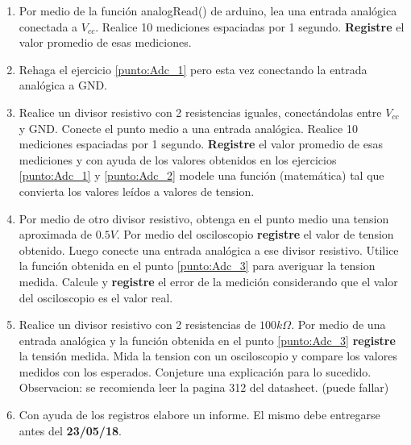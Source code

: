 \documentclass[10pt,conference,a4paper,onecolumn]{article}%
\begin{document}
\begin{enumerate}
\item  Por medio de la función analogRead() de arduino, lea una entrada analógica conectada a $V_{cc}$. Realice 10 mediciones espaciadas por 1 segundo. \textbf{Registre} el valor promedio de esas mediciones.\label{punto:Adc_1}
\item \label{punto:Adc_2} Rehaga el ejercicio \ref{punto:Adc_1} pero esta vez conectando la entrada analógica a GND.
\item \label{punto:Adc_3}  Realice un divisor resistivo con 2 resistencias iguales, conectándolas entre $V_{cc}$ y GND. Conecte el punto medio a una entrada analógica. Realice 10 mediciones espaciadas por 1 segundo. \textbf{Registre} el valor promedio de esas mediciones y  con ayuda de los valores obtenidos en los ejercicios \ref{punto:Adc_1} y \ref{punto:Adc_2} modele una función (matemática) tal que convierta los valores leídos a valores de tension. 
\item Por medio de otro divisor resistivo, obtenga en el punto medio una tension aproximada de $0.5V$. Por medio del osciloscopio \textbf{registre} el valor de tension obtenido. Luego conecte una entrada analógica a ese divisor resistivo. Utilice la función obtenida en el punto \ref{punto:Adc_3} para averiguar la tension medida. Calcule y \textbf{registre} el error de la medición considerando que el valor del osciloscopio es el valor real.   
\item Realice un divisor resistivo  con 2 resistencias de $100k\Omega$. Por medio de una entrada analógica y la función obtenida en el punto \ref{punto:Adc_3} \textbf{registre} la tensión medida. Mida la tension con un osciloscopio y compare los valores medidos con los esperados. Conjeture una explicación para lo sucedido. Observacion: se recomienda leer la pagina 312 del datasheet. (puede fallar)
\item Con ayuda de los registros elabore un informe. El mismo debe entregarse antes del \textbf{23/05/18}.
\end{enumerate}
\end{document}
